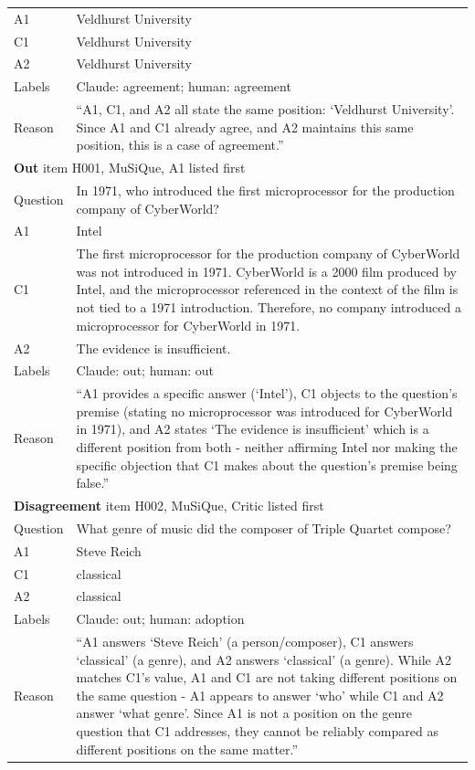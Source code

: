 \begin{small}
\begin{longtable}{p{2.3cm}p{12.6cm}}
    A1 & Veldhurst University \\
    C1 & Veldhurst University \\
    A2 & Veldhurst University \\
    Labels & Claude: agreement; human: agreement \\
    Reason & ``A1, C1, and A2 all state the same position: `Veldhurst
        University'. Since A1 and C1 already agree, and A2 maintains this same
        position, this is a case of agreement.'' \\
    \midrule
    \multicolumn{2}{l}{\textbf{Out} \quad item H001, MuSiQue, A1 listed first} \\
    \midrule
    Question & In 1971, who introduced the first microprocessor for the production
        company of CyberWorld? \\
    A1 & Intel \\
    C1 & The first microprocessor for the production company of CyberWorld was not
        introduced in 1971. CyberWorld is a 2000 film produced by Intel, and the
        microprocessor referenced in the context of the film is not tied to a 1971
        introduction. Therefore, no company introduced a microprocessor for
        CyberWorld in 1971. \\
    A2 & The evidence is insufficient. \\
    Labels & Claude: out; human: out \\
    Reason & ``A1 provides a specific answer (`Intel'), C1 objects to the
        question's premise (stating no microprocessor was introduced for
        CyberWorld in 1971), and A2 states `The evidence is insufficient' which is
        a different position from both - neither affirming Intel nor making the
        specific objection that C1 makes about the question's premise being
        false.'' \\
    \midrule
    \multicolumn{2}{l}{\textbf{Disagreement} \quad item H002, MuSiQue, Critic listed first} \\
    \midrule
    Question & What genre of music did the composer of Triple Quartet compose? \\
    A1 & Steve Reich \\
    C1 & classical \\
    A2 & classical \\
    Labels & Claude: out; human: adoption \\
    Reason & ``A1 answers `Steve Reich' (a person/composer), C1 answers
        `classical' (a genre), and A2 answers `classical' (a genre). While A2
        matches C1's value, A1 and C1 are not taking different positions on the
        same question - A1 appears to answer `who' while C1 and A2 answer `what
        genre'. Since A1 is not a position on the genre question that C1
        addresses, they cannot be reliably compared as different positions on the
        same matter.'' \\
\end{longtable}
\end{small}

